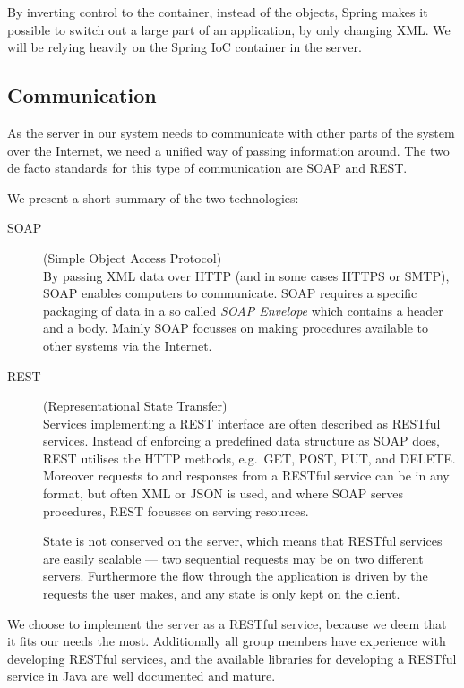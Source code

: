 By inverting control to the container, instead of the objects, Spring makes it possible to switch out a large part of an application, by only changing XML.
We will be relying heavily on the Spring \ac{IoC} container in the server.

\subsection{Communication}
\label{subsec:tech_communication}
As the server in our system needs to communicate with other parts of the system over the Internet, we need a unified way of passing information around.
The two de facto standards for this type of communication are SOAP and REST.

We present a short summary of the two technologies:
\begin{description}
    \item[SOAP] (Simple Object Access Protocol)\cite{SOAP_spec}\hfill\\
        By passing XML data over HTTP (and in some cases HTTPS or SMTP), SOAP enables computers to communicate.
        SOAP requires a specific packaging of data in a so called \textit{SOAP Envelope} which contains a header and a body.
        Mainly SOAP focusses on making procedures available to other systems via the Internet.
    \item[REST] (Representational State Transfer)\cite{RESTful_best_practices}\hfill\\
        Services implementing a REST interface are often described as RESTful services.
        Instead of enforcing a predefined data structure as SOAP does, REST utilises the HTTP methods, e.g.~GET, POST, PUT, and DELETE.
        Moreover requests to and responses from a RESTful service can be in any format, but often XML or JSON is used,
        and where SOAP serves procedures, REST focusses on serving resources.

        State is not conserved on the server, which means that RESTful services are easily scalable --- two sequential requests may be on two different servers.
        Furthermore the flow through the application is driven by the requests the user makes, and any state is only kept on the client.
\end{description}

We choose to implement the server as a RESTful service, because we deem that it fits our needs the most.
Additionally all group members have experience with developing RESTful services, and the available libraries for developing a RESTful service in Java are well documented and mature.

